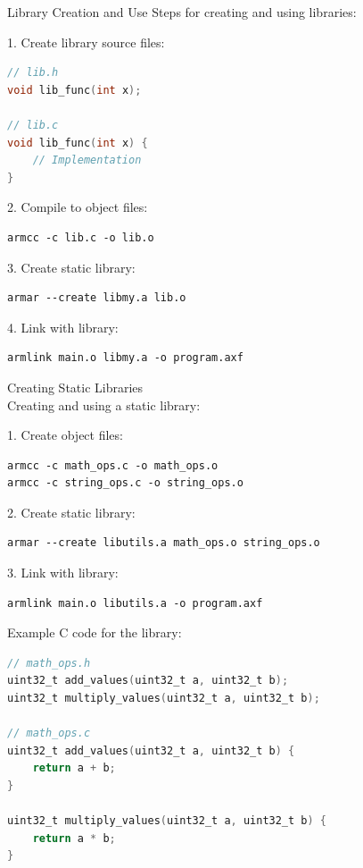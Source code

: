 \begin{KR}{Library Creation and Use}
Steps for creating and using libraries:

1. Create library source files:
\begin{lstlisting}[language=C, style=basesmol]
// lib.h
void lib_func(int x);

// lib.c
void lib_func(int x) {
    // Implementation
}
\end{lstlisting}

2. Compile to object files:
\begin{lstlisting}[style=basesmol]
armcc -c lib.c -o lib.o
\end{lstlisting}

3. Create static library:
\begin{lstlisting}[style=basesmol]
armar --create libmy.a lib.o
\end{lstlisting}

4. Link with library:
\begin{lstlisting}[style=basesmol]
armlink main.o libmy.a -o program.axf
\end{lstlisting}
\end{KR}

\begin{example2}{Creating Static Libraries}\\
Creating and using a static library:

1. Create object files:
\begin{lstlisting}[style=basesmol]
armcc -c math_ops.c -o math_ops.o
armcc -c string_ops.c -o string_ops.o
\end{lstlisting}

2. Create static library:
\begin{lstlisting}[style=basesmol]
armar --create libutils.a math_ops.o string_ops.o
\end{lstlisting}

3. Link with library:
\begin{lstlisting}[style=basesmol]
armlink main.o libutils.a -o program.axf
\end{lstlisting}

Example C code for the library:
\begin{lstlisting}[language=C, style=basesmol]
// math_ops.h
uint32_t add_values(uint32_t a, uint32_t b);
uint32_t multiply_values(uint32_t a, uint32_t b);

// math_ops.c
uint32_t add_values(uint32_t a, uint32_t b) {
    return a + b;
}

uint32_t multiply_values(uint32_t a, uint32_t b) {
    return a * b;
}
\end{lstlisting}
\end{example2}

